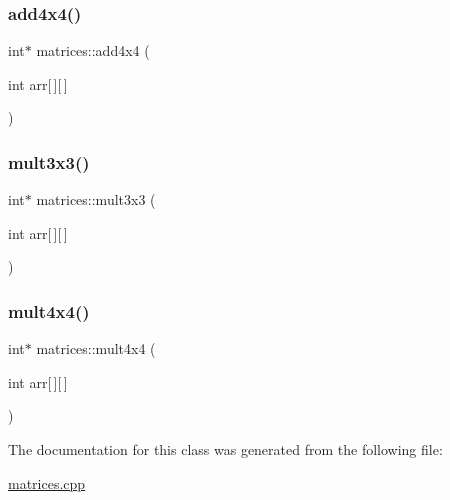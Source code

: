 \subsubsection{\texorpdfstring{add4x4()}{add4x4()}}
{\footnotesize\ttfamily int$\ast$ matrices\+::add4x4 (\begin{DoxyParamCaption}\item[{int}]{arr\mbox{[}$\,$\mbox{]}\mbox{[}$\,$\mbox{]} }\end{DoxyParamCaption})\hspace{0.3cm}{\ttfamily [inline]}}

\mbox{\label{classmatrices_a23a1caa682ac0fb8941e6f5a4cfd6cb7}} 
\subsubsection{\texorpdfstring{mult3x3()}{mult3x3()}}
{\footnotesize\ttfamily int$\ast$ matrices\+::mult3x3 (\begin{DoxyParamCaption}\item[{int}]{arr\mbox{[}$\,$\mbox{]}\mbox{[}$\,$\mbox{]} }\end{DoxyParamCaption})\hspace{0.3cm}{\ttfamily [inline]}}

\mbox{\label{classmatrices_a97708324cbb5612c867c494846116c84}} 
\subsubsection{\texorpdfstring{mult4x4()}{mult4x4()}}
{\footnotesize\ttfamily int$\ast$ matrices\+::mult4x4 (\begin{DoxyParamCaption}\item[{int}]{arr\mbox{[}$\,$\mbox{]}\mbox{[}$\,$\mbox{]} }\end{DoxyParamCaption})\hspace{0.3cm}{\ttfamily [inline]}}



The documentation for this class was generated from the following file\+:\begin{DoxyCompactItemize}
\item 
\hyperlink{matrices_8cpp}{matrices.\+cpp}\end{DoxyCompactItemize}
